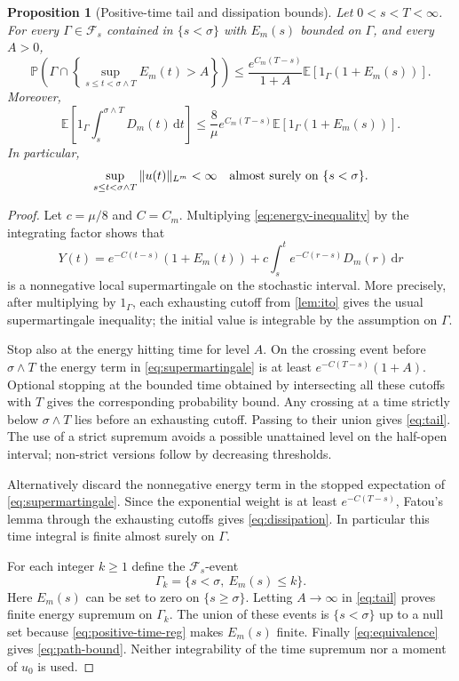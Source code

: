 \documentclass[11pt]{amsart}
\newtheorem{proposition}[theorem]{Proposition}
\theoremstyle{definition}
\newcommand{\E}{\mathbb E}
\newcommand{\PP}{\mathbb P}
\newcommand{\F}{\mathcal F}
\newcommand{\ind}{1}
\newcommand{\dd}{\,\mathrm d}
\numberwithin{equation}{section}
\begin{document}
\begin{proposition}[Positive-time tail and dissipation bounds]\label{prop:tail}
Let $0<s<T<\infty$. For every $\Gamma\in\F_s$ contained in
$\{s<\sigma\}$ with $E_m(s)$ bounded on $\Gamma$, and every $A>0$,
\begin{equation}\label{eq:tail}
\PP\left(\Gamma\cap
 \left\{\sup_{s\leq t<\sigma\wedge T}E_m(t)>A\right\}\right)
 \leq\frac{e^{C_m(T-s)}}{1+A}
 \E[\ind_\Gamma(1+E_m(s))].
\end{equation}
Moreover,
\begin{equation}\label{eq:dissipation}
\E\left[\ind_\Gamma\int_s^{\sigma\wedge T}D_m(t)\dd t\right]
 \leq\frac8\mu e^{C_m(T-s)}
 \E[\ind_\Gamma(1+E_m(s))].
\end{equation}
In particular,
\begin{equation}\label{eq:path-bound}
\sup_{s\leq t<\sigma\wedge T}\|u(t)\|_{L^m}<\infty
 \quad\hbox{almost surely on }\{s<\sigma\}.
\end{equation}
\end{proposition}
\begin{proof}
Let $c=\mu/8$ and $C=C_m$. Multiplying
\eqref{eq:energy-inequality} by the integrating factor shows that
\begin{equation}\label{eq:supermartingale}
Y(t)=e^{-C(t-s)}(1+E_m(t))
 +c\int_s^t e^{-C(r-s)}D_m(r)\dd r
\end{equation}
is a nonnegative local supermartingale on the stochastic interval.
More precisely, after multiplying by $\ind_\Gamma$, each exhausting
cutoff from \cref{lem:ito} gives the usual supermartingale inequality;
the initial value is integrable by the assumption on $\Gamma$.

Stop also at the energy hitting time for level $A$. On the crossing event
before $\sigma\wedge T$ the energy term in \eqref{eq:supermartingale}
is at least $e^{-C(T-s)}(1+A)$. Optional stopping at the bounded time
obtained by intersecting all these cutoffs with $T$ gives the
corresponding probability bound. Any crossing at a time strictly below
$\sigma\wedge T$ lies before an exhausting cutoff. Passing to their
union gives \eqref{eq:tail}. The use of a strict supremum avoids a
possible unattained level on the half-open interval; non-strict versions
follow by decreasing thresholds.

Alternatively discard the nonnegative energy term in the stopped
expectation of \eqref{eq:supermartingale}. Since the exponential weight
is at least $e^{-C(T-s)}$, Fatou's lemma through the exhausting cutoffs
gives \eqref{eq:dissipation}. In particular this time integral is finite
almost surely on $\Gamma$.

For each integer $k\geq1$ define the $\F_s$-event
\[
\Gamma_k=\{s<\sigma,\ E_m(s)\leq k\}.
\]
Here $E_m(s)$ can be set to zero on $\{s\geq\sigma\}$.
Letting $A\to\infty$ in \eqref{eq:tail} proves finite energy supremum
on $\Gamma_k$. The union of these events is $\{s<\sigma\}$ up to a
null set because \eqref{eq:positive-time-reg} makes $E_m(s)$ finite.
Finally \eqref{eq:equivalence} gives \eqref{eq:path-bound}. Neither
integrability of the time supremum nor a moment of $u_0$ is used.
\end{proof}
\end{document}
